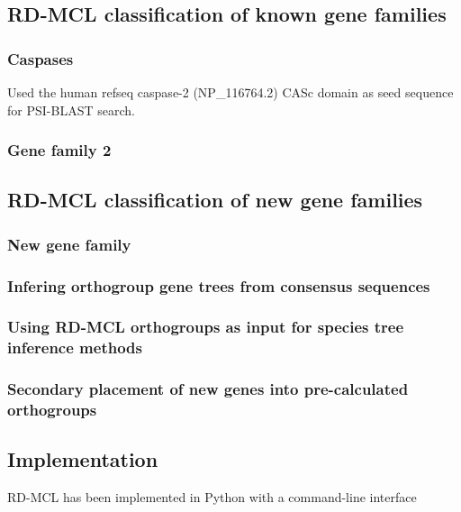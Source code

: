 \documentclass[twocolumn]{bmcart}%
\begin{document}
\subsection{RD-MCL classification of known gene families}\label{subsec:rd-mclClassificationOfKnownGeneFamilies}
\lipsum[1]

\subsubsection{Caspases}
Used the human refseq caspase-2 (NP\_116764.2) CASc domain as seed sequence for PSI-BLAST search.

\subsubsection{Gene family 2}
\lipsum[1]

\subsection{RD-MCL classification of new gene families}\label{subsec:rd-mclClassificationOfNewGeneFamilies}
\lipsum[1]

\subsubsection{New gene family}
\lipsum[2]

\subsubsection{Infering orthogroup gene trees from consensus sequences}
\lipsum[1]

\subsubsection{Using RD-MCL orthogroups as input for species tree inference methods}
\lipsum[1]

\subsubsection{Secondary placement of new genes into pre-calculated orthogroups}
\lipsum[1]

\subsection{Implementation}\label{subsec:implementation}
RD-MCL has been implemented in Python with a command-line interface
\end{document}

